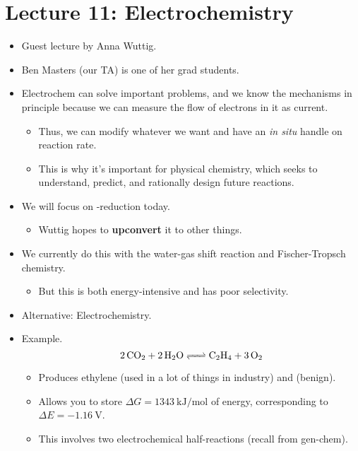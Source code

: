 \documentclass[../notes.tex]{subfiles}
\begin{document}
\section{Lecture 11: Electrochemistry}
\begin{itemize}
    \item {}Guest lecture by Anna Wuttig.
    \item Ben Masters (our TA) is one of her grad students.
    \item Electrochem can solve important problems, and we know the mechanisms in principle because we can measure the flow of electrons in it as current.
    \begin{itemize}
        \item Thus, we can modify whatever we want and have an \emph{in situ} handle on reaction rate.
        \item This is why it's important for physical chemistry, which seeks to understand, predict, and rationally design future reactions.
    \end{itemize}
    \item We will focus on -reduction today.
    \begin{itemize}
        \item Wuttig hopes to \textbf{upconvert} it to other things.
    \end{itemize}
    \item We currently do this with the water-gas shift reaction and Fischer-Tropsch chemistry.
    \begin{itemize}
        \item But this is both energy-intensive and has poor selectivity.
    \end{itemize}
    \item Alternative: Electrochemistry.
    \item Example.
    \begin{equation*}
        \ce{2CO2 + 2H2O <=> C2H4 + 3O2}
    \end{equation*}
    \begin{itemize}
        \item Produces ethylene (used in a lot of things in industry) and  (benign).
        \item Allows you to store $\Delta G=\SI{1343}{\kilo\joule\per\mole}$ of energy, corresponding to $\Delta E=-\SI{1.16}{\volt}$.
        \item This involves two electrochemical half-reactions (recall from gen-chem).
        \begin{align*}

\end{align*}
\end{itemize}
\end{itemize}
\end{document}
